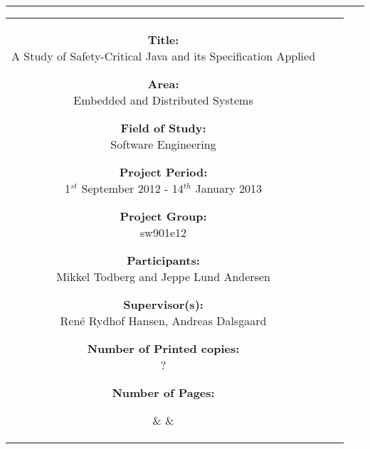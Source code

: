 \begin{titlepage}

\begin{center}
\begin{tabular}{c}
\end{tabular}
\end{center}
\vspace{-3mm}
\hrule

\vspace{5mm}

\hspace{-10mm}
\begin{tabular}{ccc}

\parbox{55mm}{
  \footnotesize
  \begin{description}
  
  \item{\textbf{Title:}          \\ A Study of Safety-Critical Java and its Specification Applied}
  \item{\textbf{Area:}           \\ Embedded and Distributed Systems}
  \item{\textbf{Field of Study:} \\ Software Engineering}
  \item{\textbf{Project Period:} \\ 1$^{st}$ September 2012 - 14$^{th}$ January 2013}
  \item{\textbf{Project Group:}  \\ sw901e12}
  \item{\textbf{Participants:}   \\ Mikkel Todberg and Jeppe Lund Andersen}
  \item{\textbf{Supervisor(s):}  \\ Ren\'{e} Rydhof Hansen, Andreas Dalsgaard}

  \item{\textbf{Number of Printed copies:} \\ ?}
  \item{\textbf{Number of Pages:} \\ \pageref{LastPage}}

  \end{description}
}

&
\hspace{5mm}
&

\fbox{
  \parbox{56mm}{
    \footnotesize
    
  }
}

\end{tabular}

\end{titlepage}
